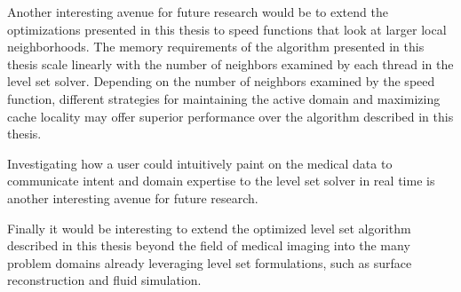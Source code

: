 Another interesting avenue for future research would be to extend the optimizations presented in this thesis to speed functions that look at larger local neighborhoods. The memory requirements of the algorithm presented in this thesis scale linearly with the number of neighbors examined by each thread in the level set solver. Depending on the number of neighbors examined by the speed
function, different strategies for maintaining the active domain and maximizing cache locality may offer superior performance over the algorithm described in this thesis.

Investigating how a user could intuitively paint on the medical data to communicate intent and domain expertise to the level set solver in real time is another interesting avenue for future research.

Finally it would be interesting to extend the optimized level set algorithm described in this thesis beyond the field of medical imaging into the many problem domains already leveraging level set formulations, such as surface reconstruction and fluid simulation.  


